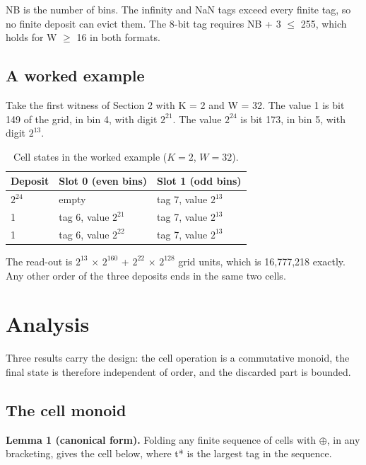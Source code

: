 \documentclass[3p,10pt]{elsarticle}
\begin{document}
NB is the number of bins. The infinity and NaN tags exceed every finite
tag, so no finite deposit can evict them. The 8-bit tag requires NB + 3
$\leq$ 255, which holds for W $\geq$ 16 in both formats.

\hypertarget{a-worked-example}{%
\subsection{A worked example}\label{a-worked-example}}

Take the first witness of Section 2 with K = 2 and W = 32. The value 1
is bit 149 of the grid, in bin 4, with digit \(2^{21}\). The value
\(2^{24}\) is bit 173, in bin 5, with digit \(2^{13}\).

\begin{table}[!htbp]\centering\small
\caption{Cell states in the worked example ($K=2$, $W=32$).}\label{tab:5}
\begin{tabular}{lll}
\toprule
Deposit & Slot 0 (even bins) & Slot 1 (odd bins) \\
\midrule
\(2^{24}\) & empty & tag 7, value \(2^{13}\) \\
1 & tag 6, value \(2^{21}\) & tag 7, value \(2^{13}\) \\
1 & tag 6, value \(2^{22}\) & tag 7, value \(2^{13}\) \\
\bottomrule
\end{tabular}
\end{table}

The read-out is \(2^{13}\) × \(2^{160}\) + \(2^{22}\) × \(2^{128}\) grid
units, which is 16,777,218 exactly. Any other order of the three
deposits ends in the same two cells.

\hypertarget{analysis}{%
\section{Analysis}\label{analysis}}

Three results carry the design: the cell operation is a commutative
monoid, the final state is therefore independent of order, and the
discarded part is bounded.

\hypertarget{the-cell-monoid}{%
\subsection{The cell monoid}\label{the-cell-monoid}}

\textbf{Lemma 1 (canonical form).} Folding any finite sequence of cells
with $\oplus$, in any bracketing, gives the cell below, where t* is the largest
tag in the sequence.
\end{document}
